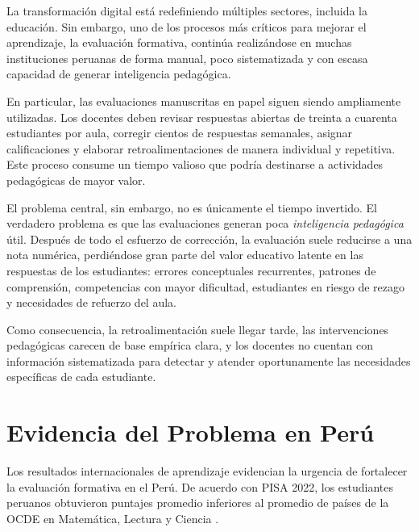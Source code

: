 \documentclass[12pt]{article}
\begin{document}
La transformación digital está redefiniendo múltiples sectores, incluida la educación. Sin embargo, uno de los procesos más críticos para mejorar el aprendizaje, la evaluación formativa, continúa realizándose en muchas instituciones peruanas de forma manual, poco sistematizada y con escasa capacidad de generar inteligencia pedagógica.

En particular, las evaluaciones manuscritas en papel siguen siendo ampliamente utilizadas. Los docentes deben revisar respuestas abiertas de treinta a cuarenta estudiantes por aula, corregir cientos de respuestas semanales, asignar calificaciones y elaborar retroalimentaciones de manera individual y repetitiva. Este proceso consume un tiempo valioso que podría destinarse a actividades pedagógicas de mayor valor.

El problema central, sin embargo, no es únicamente el tiempo invertido. El verdadero problema es que las evaluaciones generan poca \textit{inteligencia pedagógica} útil. Después de todo el esfuerzo de corrección, la evaluación suele reducirse a una nota numérica, perdiéndose gran parte del valor educativo latente en las respuestas de los estudiantes: errores conceptuales recurrentes, patrones de comprensión, competencias con mayor dificultad, estudiantes en riesgo de rezago y necesidades de refuerzo del aula.

Como consecuencia, la retroalimentación suele llegar tarde, las intervenciones pedagógicas carecen de base empírica clara, y los docentes no cuentan con información sistematizada para detectar y atender oportunamente las necesidades específicas de cada estudiante.

\section{Evidencia del Problema en Perú}

Los resultados internacionales de aprendizaje evidencian la urgencia de fortalecer la evaluación formativa en el Perú. De acuerdo con PISA 2022, los estudiantes peruanos obtuvieron puntajes promedio inferiores al promedio de países de la OCDE en Matemática, Lectura y Ciencia \cite{OECDPISA2022Peru}.
\end{document}

